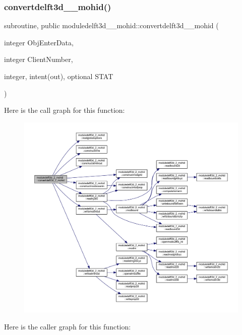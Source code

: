 \subsubsection{\texorpdfstring{convertdelft3d\+\_\+\_\+mohid()}{convertdelft3d\_2\_mohid()}}
{\footnotesize\ttfamily subroutine, public moduledelft3d\+\_\+\_\+mohid\+::convertdelft3d\+\_\+\_\+mohid (\begin{DoxyParamCaption}\item[{integer}]{Obj\+Enter\+Data,  }\item[{integer}]{Client\+Number,  }\item[{integer, intent(out), optional}]{S\+T\+AT }\end{DoxyParamCaption})}

Here is the call graph for this function\+:\nopagebreak
\begin{figure}[H]
\begin{center}
\leavevmode
\includegraphics[width=350pt]{namespacemoduledelft3d__2__mohid_a03b75d6d9aec2bf65fd05cc9aaec61ab_cgraph}
\end{center}
\end{figure}
Here is the caller graph for this function\+:\nopagebreak
